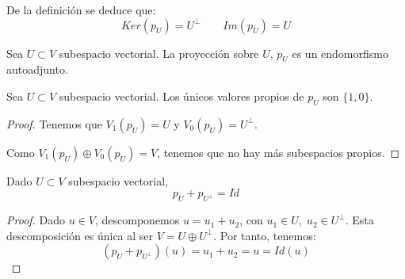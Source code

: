 De la definición se deduce que:
\begin{equation*}
    Ker(p_U)=U^\perp \qquad Im(p_U) = U
\end{equation*}

\begin{prop}
    Sea $U\subset V$ subespacio vectorial. La proyección sobre $U$, $p_U$ es un endomorfismo autoadjunto.
\end{prop}


\begin{prop}
    Sea $U\subset V$ subespacio vectorial. Los únicos valores propios de $p_U$ son $\{1,0\}$.
\end{prop}
\begin{proof}
    Tenemos que $V_1(p_U) = U$ y $V_{0}(p_U) = U^\perp$.
    
    Como $V_1(p_U)\oplus V_{0}(p_U) = V$, tenemos que no hay más subespacios propios.
\end{proof}

\begin{lema} Dado $U\subset V$ subespacio vectorial,
    \begin{equation*}
        p_U + p_{U^\perp} = Id
    \end{equation*}
\end{lema}
\begin{proof}
    Dado $u\in V$, descomponemos $u=u_1+u_2$, con $u_1\in U,\;u_2\in U^\perp$. Esta descomposición es única al ser $V=U\oplus U^\perp$. Por tanto, tenemos:
    \begin{equation*}
        (p_U + p_{U^\perp})(u)=u_1+u_2=u = Id(u)
    \end{equation*}
\end{proof}

